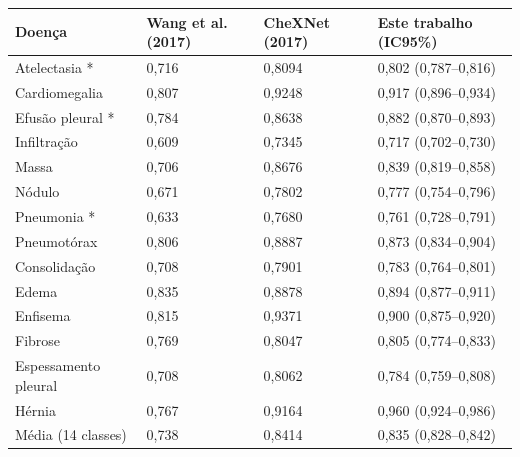 \begin{tabular}{llll}
\toprule
Doença & Wang et al. (2017) & CheXNet (2017) & Este trabalho (IC95\%) \\
\midrule
Atelectasia * & 0,716 & 0,8094 & 0,802 (0,787–0,816) \\
Cardiomegalia & 0,807 & 0,9248 & 0,917 (0,896–0,934) \\
Efusão pleural * & 0,784 & 0,8638 & 0,882 (0,870–0,893) \\
Infiltração & 0,609 & 0,7345 & 0,717 (0,702–0,730) \\
Massa & 0,706 & 0,8676 & 0,839 (0,819–0,858) \\
Nódulo & 0,671 & 0,7802 & 0,777 (0,754–0,796) \\
Pneumonia * & 0,633 & 0,7680 & 0,761 (0,728–0,791) \\
Pneumotórax & 0,806 & 0,8887 & 0,873 (0,834–0,904) \\
Consolidação & 0,708 & 0,7901 & 0,783 (0,764–0,801) \\
Edema & 0,835 & 0,8878 & 0,894 (0,877–0,911) \\
Enfisema & 0,815 & 0,9371 & 0,900 (0,875–0,920) \\
Fibrose & 0,769 & 0,8047 & 0,805 (0,774–0,833) \\
Espessamento pleural & 0,708 & 0,8062 & 0,784 (0,759–0,808) \\
Hérnia & 0,767 & 0,9164 & 0,960 (0,924–0,986) \\
Média (14 classes) & 0,738 & 0,8414 & 0,835 (0,828–0,842) \\
\bottomrule
\end{tabular}
